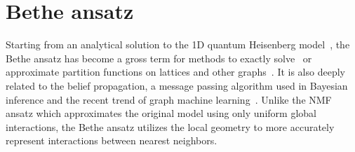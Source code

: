 \section{Bethe ansatz}
\label{sec:bethe}

Starting from an analytical solution to the 1D quantum Heisenberg model~\cite{bethe1931theorie}, the Bethe ansatz has become a gross term for methods to exactly solve~\cite{baxter1995solvable, caravelli2022some} or approximate partition functions on lattices and other graphs~\cite{gujrati1995bethe, mezard2001bethe}. It is also deeply related to the belief propagation, a message passing algorithm used in Bayesian inference and the recent trend of graph machine learning~\cite{yedidia2003understanding, ikeda2004stochastic}. Unlike the NMF ansatz which approximates the original model using only uniform global interactions, the Bethe ansatz utilizes the local geometry to more accurately represent interactions between nearest neighbors.

